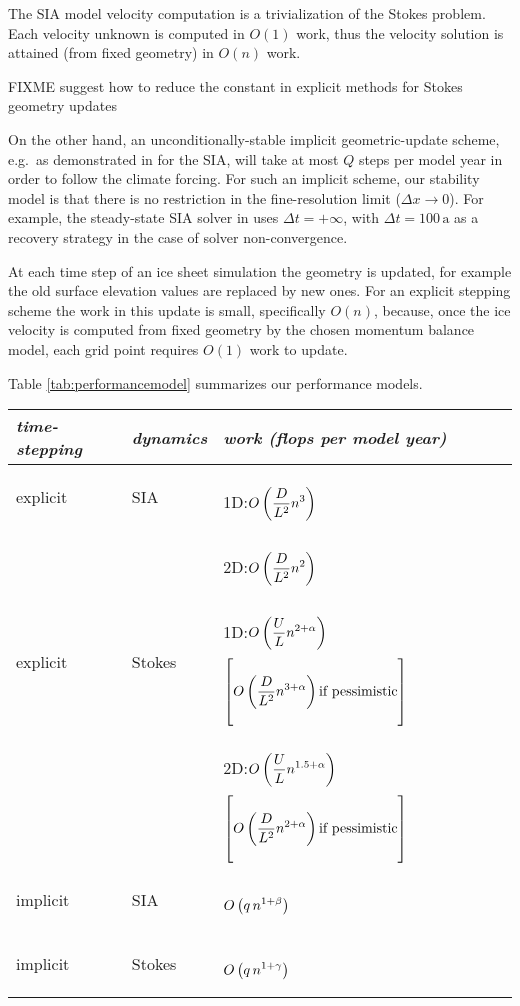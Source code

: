 \documentclass[twocolumn,letterpaper]{igs}
\begin{document}
The SIA model velocity computation is a trivialization of the Stokes problem.  Each velocity unknown is computed in $O(1)$ work, thus the velocity solution is attained (from fixed geometry) in $O(n)$ work.

FIXME \citep{LofgrenAhlkronaHelanow2021} suggest how to reduce the constant in explicit methods for Stokes geometry updates

On the other hand, an unconditionally-stable implicit geometric-update scheme, e.g.~as demonstrated in \citep{Bueler2016} for the SIA, will take at most $Q$ steps per model year in order to follow the climate forcing.  For such an implicit scheme, our stability model is that there is no restriction in the fine-resolution limit ($\Delta x \to 0$).  For example, the steady-state SIA solver in \cite{Bueler2016} uses $\Delta t=+\infty$, with $\Delta t = 100 \,\text{a}$ as a recovery strategy in the case of solver non-convergence.

At each time step of an ice sheet simulation the geometry is updated, for example the old surface elevation values are replaced by new ones.  For an explicit stepping scheme the work in this update is small, specifically $O(n)$, because, once the ice velocity is computed from fixed geometry by the chosen momentum balance model, each grid point requires $O(1)$ work to update.

Table \ref{tab:performancemodel} summarizes our performance models.

\newcommand{\oo}[1]{{\LARGE \strut} \displaystyle O\left(#1\right)}
\setlength{\tabcolsep}{5pt}
\renewcommand{\arraystretch}{1.5}
\begin{table*}[ht]
\begin{tabular}{lll}
\emph{time-stepping} & \emph{dynamics} & \emph{work (flops per model year)} \\ \hline
explicit & SIA    & 1D:\quad $\oo{\frac{D}{L^2} n^3}$ \\
         &        & 2D:\quad $\oo{\frac{D}{L^2} n^2}$ \\
explicit & Stokes & 1D:\quad $\oo{\frac{U}{L} n^{2+\alpha}}$ \quad $\left[\oo{\frac{D}{L^2} n^{3+\alpha}} \text{if pessimistic}\right]$ \\
         &        & 2D:\quad $\oo{\frac{U}{L} n^{1.5+\alpha}}$ \quad $\left[\oo{\frac{D}{L^2} n^{2+\alpha}} \text{if pessimistic}\right]$ \\
implicit & SIA    & $\oo{q\, n^{1+\beta}}$ \\
implicit & Stokes & $\oo{q\, n^{1+\gamma}}$
\end{tabular}
\caption{Asymptotic scaling of computational work for time-stepping numerical ice sheet simulations as the degrees of freedom $n$ goes to infinity (high horizontal resolution).  Note 1D and 2D refer to flow-line and map-plane simulations, respectively.  See Table \ref{tab:notation} for remaining notation.}
\label{tab:performancemodel}
\end{table*}
\end{document}
